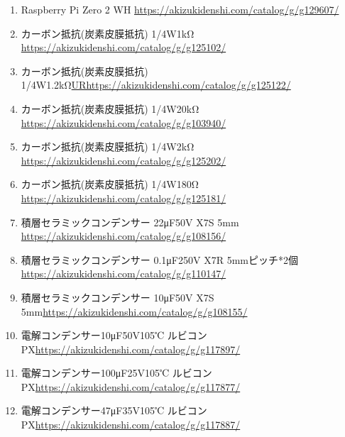 \documentclass[a4paper,10pt]{jarticle}
\begin{document}
\begin{enumerate}
    \item Raspberry Pi Zero 2 WH \url{https://akizukidenshi.com/catalog/g/g129607/}
    \item カーボン抵抗(炭素皮膜抵抗) 1/4W1kΩ \url{https://akizukidenshi.com/catalog/g/g125102/}
    \item カーボン抵抗(炭素皮膜抵抗) 1/4W1.2kΩ\url{URhttps://akizukidenshi.com/catalog/g/g125122/}
    \item カーボン抵抗(炭素皮膜抵抗) 1/4W20kΩ \url{https://akizukidenshi.com/catalog/g/g103940/}
    \item カーボン抵抗(炭素皮膜抵抗) 1/4W2kΩ \url{https://akizukidenshi.com/catalog/g/g125202/}
    \item カーボン抵抗(炭素皮膜抵抗) 1/4W180Ω \url{https://akizukidenshi.com/catalog/g/g125181/}
    \item 積層セラミックコンデンサー 22μF50V X7S 5mm \url{https://akizukidenshi.com/catalog/g/g108156/}
    \item 積層セラミックコンデンサー 0.1μF250V X7R 5mmピッチ*2個\url{https://akizukidenshi.com/catalog/g/g110147/}
    \item 積層セラミックコンデンサー 10μF50V X7S 5mm\url{https://akizukidenshi.com/catalog/g/g108155/}
    \item 電解コンデンサー10μF50V105℃ ルビコンPX\url{https://akizukidenshi.com/catalog/g/g117897/}
    \item 電解コンデンサー100μF25V105℃ ルビコンPX\url{https://akizukidenshi.com/catalog/g/g117877/}
    \item 電解コンデンサー47μF35V105℃ ルビコンPX\url{https://akizukidenshi.com/catalog/g/g117887/}

\end{enumerate}
\end{document}
